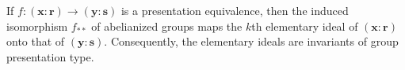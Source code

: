 If $f: (\mathbf{x}:\mathbf{r}) \to (\mathbf{y}:\mathbf{s})$ is a presentation equivalence, then the induced isomorphism $f_{**}$ of abelianized groups maps the $k$th elementary ideal of $(\mathbf{x}:\mathbf{r})$ onto that of $(\mathbf{y}:\mathbf{s})$. Consequently, the elementary ideals are invariants of group presentation type.
